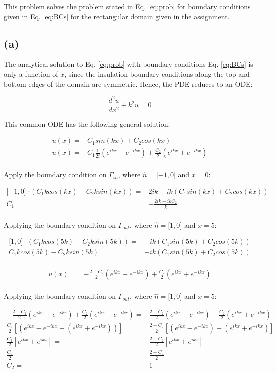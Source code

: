 \documentclass[10pt]{article}
\newcommand{\beq}{\begin{equation}}
\newcommand{\eeq}{\end{equation}}
\newcommand{\beqa}{\begin{equation}\begin{aligned}}
\newcommand{\eeqa}{\end{aligned}\end{equation}}
\begin{document}
This problem solves the problem stated in Eq. \eqref{eq:prob} for boundary conditions given in Eq. \eqref{eq:BCs} for the rectangular domain given in the assignment.

\subsection{(a)}

The analytical solution to Eq. \eqref{eq:prob} with boundary conditions Eq. \eqref{eq:BCs} is only a function of \(x\), since the insulation boundary conditions along the top and bottom edges of the domain are symmetric. Hence, the PDE reduces to an ODE:

\beq
\frac{d^2u}{dx^2}+k^2u=0
\eeq

This common ODE has the following general solution:

\beqa
u(x)=&C_1sin(kx)+C_2cos(kx)\\
u(x)=&C_1\frac{1}{2i}\left(e^{ikx}-e^{-ikx}\right)+\frac{C_2}{2}\left(e^{ikx}+e^{-ikx}\right)\\
\eeqa

Apply the boundary condition on \(\Gamma_{in}\), where \(\hat{n}=\lbrack -1, 0\rbrack\) and \(x=0\):

\beqa
\lbrack -1, 0\rbrack\cdot(C_1kcos(kx)-C_2ksin(kx))=&2ik-ik(C_1sin(kx)+C_2cos(kx))\\
C_1=&-\frac{2ik-ikC_2}{k}\\
\eeqa

Applying the boundary condition on \(\Gamma_{out}\), where \(\hat{n}=\lbrack 1, 0\rbrack\) and \(x=5\):

\beqa
\lbrack 1, 0\rbrack\cdot(C_1kcos(5k)-C_2ksin(5k))=&-ik(C_1sin(5k)+C_2cos(5k))\\
C_1kcos(5k)-C_2ksin(5k)=&-ik(C_1sin(5k)+C_2cos(5k))\\
\eeqa

\beqa
u(x)=&-\frac{2-C_2}{2}\left(e^{ikx}-e^{-ikx}\right)+\frac{C_2}{2}\left(e^{ikx}+e^{-ikx}\right)\\
\eeqa

Applying the boundary condition on \(\Gamma_{out}\), where \(\hat{n}=\lbrack 1, 0\rbrack\) and \(x=5\):

\beqa
-\frac{2-C_2}{2}\left(e^{ikx}+e^{-ikx}\right)+\frac{C_2}{2}\left(e^{ikx}-e^{-ikx}\right)=&\frac{2-C_2}{2}\left(e^{ikx}-e^{-ikx}\right)-\frac{C_2}{2}\left(e^{ikx}+e^{-ikx}\right)\\
\frac{C_2}{2}\left\lbrack\left(e^{ikx}-e^{-ikx}+\left(e^{ikx}+e^{-ikx}\right)\right)\right\rbrack=&\frac{2-C_2}{2}\left\lbrack\left(e^{ikx}-e^{-ikx}\right)+\left(e^{ikx}+e^{-ikx}\right)\right\rbrack\\
\frac{C_2}{2}\left\lbrack e^{ikx}+e^{ikx}\right\rbrack=&\frac{2-C_2}{2}\left\lbrack e^{ikx}+e^{ikx}\right\rbrack\\
\frac{C_2}{2}=&\frac{2-C_2}{2}\\
C_2=&1\\
\eeqa
\end{document}
